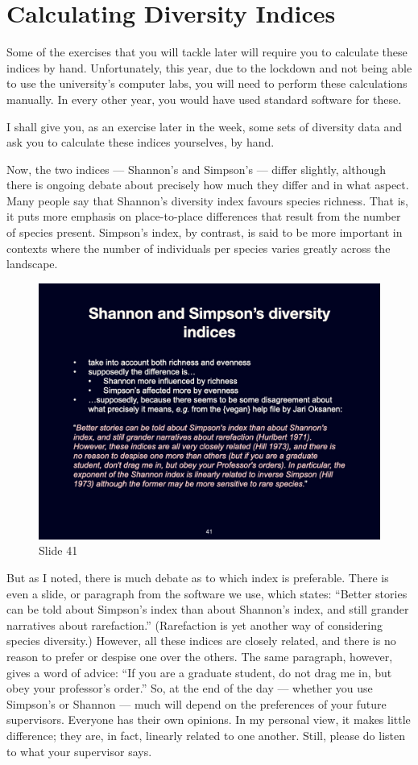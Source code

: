 \documentclass[
  12pt,
]{book}
\begin{document}
\section{Calculating Diversity
Indices}\label{calculating-diversity-indices}

Some of the exercises that you will tackle later will require you to
calculate these indices by hand. Unfortunately, this year, due to the
lockdown and not being able to use the university's computer labs, you
will need to perform these calculations manually. In every other year,
you would have used standard software for these.

I shall give you, as an exercise later in the week, some sets of
diversity data and ask you to calculate these indices yourselves, by
hand.

Now, the two indices --- Shannon's and Simpson's --- differ slightly,
although there is ongoing debate about precisely how much they differ
and in what aspect. Many people say that Shannon's diversity index
favours species richness. That is, it puts more emphasis on
place-to-place differences that result from the number of species
present. Simpson's index, by contrast, is said to be more important in
contexts where the number of individuals per species varies greatly
across the landscape.

\begin{figure}[ht]
\centering
\includegraphics[width=0.8\linewidth]{../images/BDC334/BDC334-041.jpeg}
\caption*{Slide 41}
\end{figure}

But as I noted, there is much debate as to which index is preferable.
There is even a slide, or paragraph from the software we use, which
states: ``Better stories can be told about Simpson's index than about
Shannon's index, and still grander narratives about rarefaction.''
(Rarefaction is yet another way of considering species diversity.)
However, all these indices are closely related, and there is no reason
to prefer or despise one over the others. The same paragraph, however,
gives a word of advice: ``If you are a graduate student, do not drag me
in, but obey your professor's order.'' So, at the end of the day ---
whether you use Simpson's or Shannon --- much will depend on the
preferences of your future supervisors. Everyone has their own opinions.
In my personal view, it makes little difference; they are, in fact,
linearly related to one another. Still, please do listen to what your
supervisor says.
\end{document}
